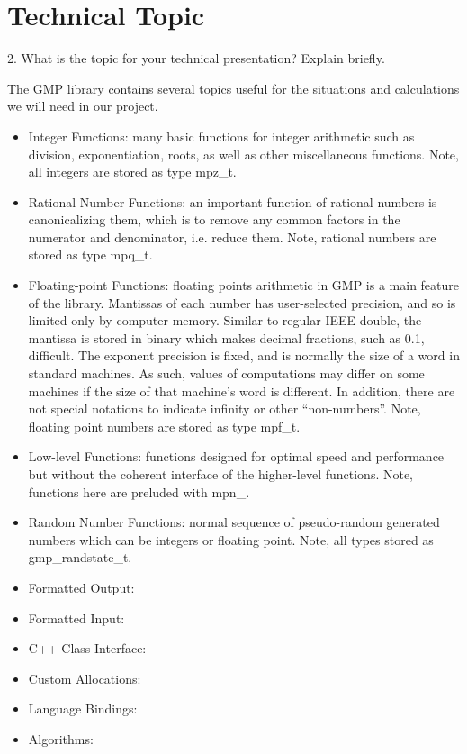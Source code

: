 \section{Technical Topic}
2. What is the topic for your technical presentation?
Explain briefly.

The GMP library contains several topics useful for the
situations and calculations we will need in our project.

\begin{itemize}

\item Integer Functions: many basic functions for integer
  arithmetic such as division, exponentiation, roots, as
  well as other miscellaneous functions. Note, all integers
  are stored as type mpz\_t.

\item Rational Number Functions: an important function of
  rational numbers is canonicalizing them, which is to
  remove any common factors in the numerator and
  denominator, i.e. reduce them. Note, rational numbers are
  stored as type mpq\_t.

\item Floating-point Functions: floating points arithmetic
  in GMP is a main feature of the library. Mantissas of each
  number has user-selected precision, and so is limited only
  by computer memory. Similar to regular IEEE double, the
  mantissa is stored in binary   which makes decimal
  fractions, such as 0.1, difficult. The exponent precision
  is fixed, and is normally the size of a word in standard
  machines. As such, values of computations may differ on
  some machines if the size of that machine's word is
  different. In addition, there are not special
  notations to indicate infinity or other ``non-numbers''.
  Note, floating point numbers are stored as type mpf\_t.

\item Low-level Functions: functions designed for optimal
  speed and performance but without the coherent interface
  of the higher-level functions. Note, functions here are
  preluded with mpn\_.

\item Random Number Functions: normal sequence of
  pseudo-random generated numbers which can be integers or
  floating point. Note, all types stored as
  gmp\_randstate\_t.

\item Formatted Output:
\item Formatted Input:
\item C++ Class Interface:
\item Custom Allocations:
\item Language Bindings:
\item Algorithms:

\end{itemize}

